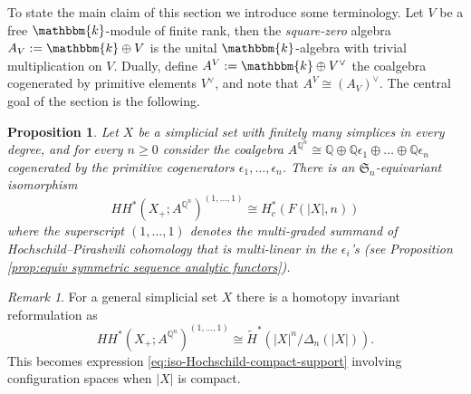 \documentclass[12pt]{article}
\newcommand{\Q}{\mathbb{Q}}
\newcommand{\kk}{\mathbbm{k}}
\newcommand{\SymGroup}[1][n]{\mathfrak{S}_{#1}}
\theoremstyle{plain}
\newtheorem{prop}[thm]{Proposition}
\theoremstyle{definition}
\theoremstyle{remark}
\newtheorem{rmk}[thm]{Remark}
\begin{document}
To state the main claim of this section we introduce some terminology. Let $V$ be a free $\kk$-module of finite rank, then the \emph{square-zero} algebra $A_V := \kk \oplus V$ is the unital $\kk$-algebra with trivial multiplication on $V$. Dually, define $A^V := \kk \oplus V^{\vee}$ the coalgebra cogenerated by primitive elements $V^\vee$, and note that $A^V \cong (A_V)^\vee$.
The central goal of the section is the following.

\begin{prop}\label{prop:geometry of HH}
Let $X$ be a simplicial set with finitely many simplices in every degree, and for every $n\geq 0$ consider the coalgebra $A^{\Q^n}\cong \Q \oplus \Q\epsilon_1\oplus \ldots \oplus\Q\epsilon_n$ cogenerated by the primitive cogenerators $\epsilon_1,\ldots, \epsilon_n$. There is an $\SymGroup$-equivariant isomorphism
\begin{equation}\label{eq:iso-Hochschild-compact-support}
    HH^{\ast}(X_+; A^{\Q^n})^{(1,\ldots, 1)} \cong H_c^{\ast}(F(|X|, n))
\end{equation}
where the superscript $(1,\ldots,1)$ denotes the multi-graded summand of Hochschild--Pirashvili cohomology that is multi-linear in the $\epsilon_i$'s (see Proposition \ref{prop:equiv symmetric sequence analytic functors}).
\end{prop}

\begin{rmk}
For a general simplicial set $X$ there is a homotopy invariant reformulation as
\[
HH^{\ast}(X_+; A^{\Q^n})^{(1,\ldots, 1)} \cong \tilde{H}^{\ast}(|X|^n/\Delta_n(|X|)).
\]
This becomes expression \eqref{eq:iso-Hochschild-compact-support} involving configuration spaces when $|X|$ is compact.
\end{rmk}

\end{document}
